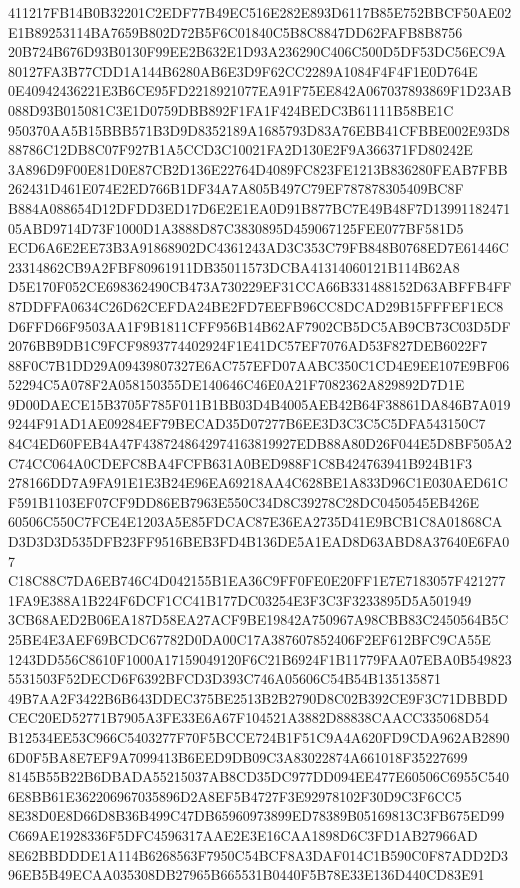 \documentclass[UTF8,fontset=fandol,zihao=-4,a4paper]{ctexart}
\begin{document}
{{411217FB14B0B32201C2EDF77B49EC516E282E893D6117B85E752BBCF50AE02E1B89253114BA7659B802D72B5F6C01840C5B8C8847DD62FAFB8B8756
20B724B676D93B0130F99EE2B632E1D93A236290C406C500D5DF53DC56EC9A80127FA3B77CDD1A144B6280AB6E3D9F62CC2289A1084F4F4F1E0D764E
0E40942436221E3B6CE95FD2218921077EA91F75EE842A067037893869F1D23AB088D93B015081C3E1D0759DBB892F1FA1F424BEDC3B61111B58BE1C
950370AA5B15BBB571B3D9D8352189A1685793D83A76EBB41CFBBE002E93D888786C12DB8C07F927B1A5CCD3C10021FA2D130E2F9A366371FD80242E
3A896D9F00E81D0E87CB2D136E22764D4089FC823FE1213B836280FEAB7FBB262431D461E074E2ED766B1DF34A7A805B497C79EF787878305409BC8F
B884A088654D12DFDD3ED17D6E2E1EA0D91B877BC7E49B48F7D1399118247105ABD9714D73F1000D1A3888D87C3830895D459067125FEE077BF581D5
ECD6A6E2EE73B3A91868902DC4361243AD3C353C79FB848B0768ED7E61446C23314862CB9A2FBF80961911DB35011573DCBA41314060121B114B62A8
D5E170F052CE698362490CB473A730229EF31CCA66B331488152D63ABFFB4FF87DDFFA0634C26D62CEFDA24BE2FD7EEFB96CC8DCAD29B15FFFEF1EC8
D6FFD66F9503AA1F9B1811CFF956B14B62AF7902CB5DC5AB9CB73C03D5DF2076BB9DB1C9FCF9893774402924F1E41DC57EF7076AD53F827DEB6022F7
88F0C7B1DD29A09439807327E6AC757EFD07AABC350C1CD4E9EE107E9BF0652294C5A078F2A058150355DE140646C46E0A21F7082362A829892D7D1E
9D00DAECE15B3705F785F011B1BB03D4B4005AEB42B64F38861DA846B7A0199244F91AD1AE09284EF79BECAD35D07277B6EE3D3C3C5C5DFA543150C7
84C4ED60FEB4A47F4387248642974163819927EDB88A80D26F044E5D8BF505A2C74CC064A0CDEFC8BA4FCFB631A0BED988F1C8B424763941B924B1F3
278166DD7A9FA91E1E3B24E96EA69218AA4C628BE1A833D96C1E030AED61CF591B1103EF07CF9DD86EB7963E550C34D8C39278C28DC0450545EB426E
60506C550C7FCE4E1203A5E85FDCAC87E36EA2735D41E9BCB1C8A01868CAD3D3D3D535DFB23FF9516BEB3FD4B136DE5A1EAD8D63ABD8A37640E6FA07
C18C88C7DA6EB746C4D042155B1EA36C9FF0FE0E20FF1E7E7183057F4212771FA9E388A1B224F6DCF1CC41B177DC03254E3F3C3F3233895D5A501949
3CB68AED2B06EA187D58EA27ACF9BE19842A750967A98CBB83C2450564B5C25BE4E3AEF69BCDC67782D0DA00C17A387607852406F2EF612BFC9CA55E
1243DD556C8610F1000A17159049120F6C21B6924F1B11779FAA07EBA0B5498235531503F52DECD6F6392BFCD3D393C746A05606C54B54B135135871
49B7AA2F3422B6B643DDEC375BE2513B2B2790D8C02B392CE9F3C71DBBDDCEC20ED52771B7905A3FE33E6A67F104521A3882D88838CAACC335068D54
B12534EE53C966C5403277F70F5BCCE724B1F51C9A4A620FD9CDA962AB28906D0F5BA8E7EF9A7099413B6EED9DB09C3A83022874A661018F35227699
8145B55B22B6DBADA55215037AB8CD35DC977DD094EE477E60506C6955C5406E8BB61E362206967035896D2A8EF5B4727F3E92978102F30D9C3F6CC5
8E38D0E8D66D8B36B499C47DB65960973899ED78389B05169813C3FB675ED99C669AE1928336F5DFC4596317AAE2E3E16CAA1898D6C3FD1AB27966AD
8E62BBDDDE1A114B6268563F7950C54BCF8A3DAF014C1B590C0F87ADD2D396EB5B49ECAA035308DB27965B665531B0440F5B78E33E136D440CD83E91
}}
\end{document}
